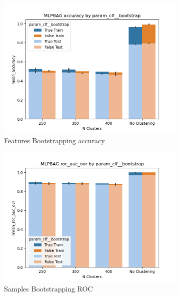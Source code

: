 \documentclass[12pt]{article}
\begin{document}
\begin{figure}
  \begin{subfigure}{.5\textwidth}
      \includegraphics[width=.95\textwidth]{../../results/mlpbag/param_clf__bootstrap_accuracy_param_Kmean.png}
      \caption{Features Bootstrapping accuracy}
      \end{subfigure}%
    \begin{subfigure}{.5\textwidth}
      \includegraphics[width=.95\textwidth]{../../results/mlpbag/param_clf__bootstrap_roc_auc_ovr_param_Kmean.png}
      \caption{Samples Bootstrapping ROC}
    \end{subfigure}
    \begin{subfigure}{.5\textwidth}

\end{subfigure}
\end{figure}
\end{document}
